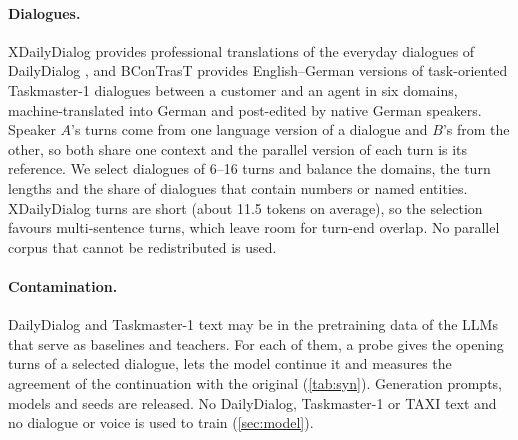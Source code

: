 \paragraph{Dialogues.}
XDailyDialog \citep{liu2023xdailydialog} provides professional translations of the everyday dialogues of DailyDialog \citep{li2017dailydialog}, and BConTrasT \citep{farajian2020findings} provides English--German versions of task-oriented Taskmaster-1 dialogues \citep{byrne2019taskmaster} between a customer and an agent in six domains, machine-translated into German and post-edited by native German speakers. Speaker $A$'s turns come from one language version of a dialogue and $B$'s from the other, so both share one context and the parallel version of each turn is its reference. We select dialogues of 6--16 turns and balance the domains, the turn lengths and the share of dialogues that contain numbers or named entities. XDailyDialog turns are short (about 11.5 tokens on average), so the selection favours multi-sentence turns, which leave room for turn-end overlap. No parallel corpus that cannot be redistributed is used.

\paragraph{Contamination.}
DailyDialog and Taskmaster-1 text may be in the pretraining data of the LLMs that serve as baselines and teachers. For each of them, a probe gives the opening turns of a selected dialogue, lets the model continue it and measures the agreement of the continuation with the original (\cref{tab:syn}). Generation prompts, models and seeds are released. No DailyDialog, Taskmaster-1 or TAXI text and no \syn dialogue or voice is used to train \model (\cref{sec:model}).

